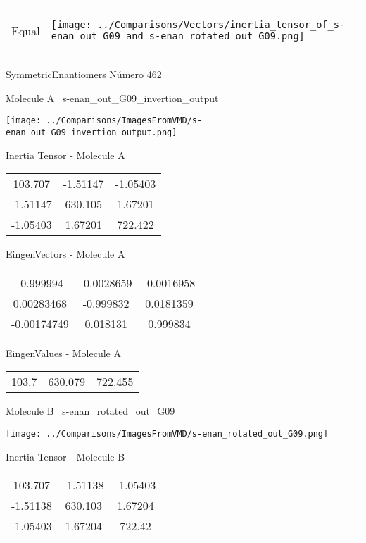 \vtab[-5mm]
\begin{tabular}{*{2}{m{}}}
\begin{center}
\textcolor{NavyBlue}{\Large Equal}
\end{center}
&
\begin{center}
\texttt{[image: ../Comparisons/Vectors/inertia\_tensor\_of\_s-enan\_out\_G09\_and\_s-enan\_rotated\_out\_G09.png]}
\end{center}
\end{tabular}

 \newpage

\vtab[-3cm]
\begin{center}
{\large SymmetricEnantiomers \tab Número 462}
\end{center}
\begin{multicols}{2}
\begin{center}

Molecule A \
s-enan\_out\_G09\_invertion\_output

\texttt{[image: ../Comparisons/ImagesFromVMD/s-enan\_out\_G09\_invertion\_output.png]}

Inertia Tensor - Molecule A \\
\begin{tabular}{|c c c|}
103.707	 & 	-1.51147	 & 	-1.05403	 \\
-1.51147	 & 	630.105	 & 	1.67201	 \\
-1.05403	 & 	1.67201	 & 	722.422
\end{tabular}

\vtab
 EingenVectors - Molecule A     \\
\begin{tabular}{|c c c|}
-0.999994	 & 	-0.0028659	 & 	-0.0016958	 \\
0.00283468	 & 	-0.999832	 & 	0.0181359	 \\
-0.00174749	 & 	0.018131	 & 	0.999834
\end{tabular}

\vtab
 EingenValues - Molecule A     \\
\begin{tabular}{|c c c|}
103.7	 & 	630.079	 & 	722.455	 \\
\end{tabular}
\columnbreak

Molecule B \
s-enan\_rotated\_out\_G09

\texttt{[image: ../Comparisons/ImagesFromVMD/s-enan\_rotated\_out\_G09.png]}

Inertia Tensor - Molecule B \\
\begin{tabular}{|c c c|}
103.707	 & 	-1.51138	 & 	-1.05403	 \\
-1.51138	 & 	630.103	 & 	1.67204	 \\
-1.05403	 & 	1.67204	 & 	722.42
\end{tabular}


\end{center}
\end{multicols}
